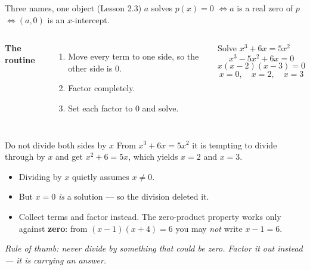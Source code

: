 \documentclass[aspectratio=169, 11pt]{beamer}
\begin{document}
\begin{frame}[t, plain]

  \begin{block}{Three names, one object (Lesson 2.3)}
    \(a\) solves \(p(x) = 0\) \quad\(\Longleftrightarrow\)\quad \(a\) is a real
    zero of \(p\) \quad\(\Longleftrightarrow\)\quad \((a,0)\) is an
    \(x\)-intercept.
  \end{block}

  \bigskip
  \begin{columns}[T]
      \textbf{The routine}
      \begin{enumerate}\setlength{\itemsep}{6pt}
        \item Move every term to one side, so the other side is \(0\).
        \item Factor completely.
        \item Set each factor to \(0\) and solve.
      \end{enumerate}

      \begin{block}{Solve \(x^3 + 6x = 5x^2\)}
        \[ x^3 - 5x^2 + 6x = 0 \]
        \[ x(x-2)(x-3) = 0 \]
        \[ x = 0, \quad x = 2, \quad x = 3 \]
      \end{block}
  \end{columns}
\end{frame}

\begin{frame}[t, plain]

  \begin{block}{Do not divide both sides by \(x\)}
    From \(x^3 + 6x = 5x^2\) it is tempting to divide through by \(x\) and get
    \(x^2 + 6 = 5x\), which yields \(x = 2\) and \(x = 3\).
  \end{block}

  \bigskip
  \begin{itemize}\setlength{\itemsep}{10pt}
    \item Dividing by \(x\) quietly assumes \(x \ne 0\).
    \item But \(x = 0\) \textit{is} a solution --- so the division deleted it.
    \item Collect terms and factor instead. The zero-product property works
          only against \textbf{zero}: from \((x-1)(x+4) = 6\) you may
          \textit{not} write \(x - 1 = 6\).
  \end{itemize}

  \bigskip
  \textit{Rule of thumb: never divide by something that could be zero. Factor
  it out instead --- it is carrying an answer.}
\end{frame}
\end{document}
